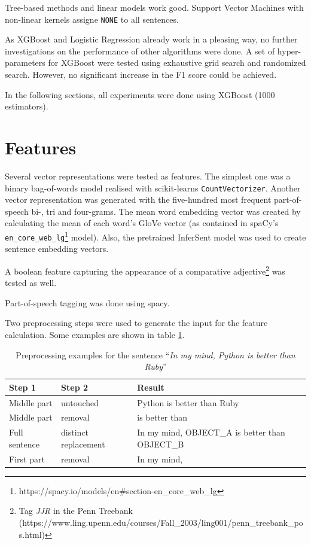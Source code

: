 Tree-based methods and linear models work good. Support Vector Machines with non-linear kernels assigne \texttt{NONE} to all sentences.

As XGBoost and Logistic Regression already work in a pleasing way, no further investigations on the performance of other algorithms were done. A set of hyper-parameters for XGBoost were tested using exhaustive grid search and randomized search. However, no significant increase in the F1 score could be achieved.

In the following sections, all experiments were done using XGBoost (1000 estimators).


\section{Features}
Several vector representations were tested as features. The simplest one was a binary bag-of-words model realised with scikit-learns \texttt{CountVectorizer}. Another vector representation was generated with the five-hundred most frequent part-of-speech bi-, tri and four-grams. The mean word embedding vector was created by calculating the mean of each word's GloVe vector (as contained in spaCy's \texttt{en\_core\_web\_lg}\footnote{https://spacy.io/models/en\#section-en\_core\_web\_lg} model). Also, the pretrained InferSent model was used to create sentence embedding vectors.

A boolean feature capturing the appearance of a comparative adjective\footnote{Tag \emph{JJR} in the Penn Treebank (https://www.ling.upenn.edu/courses/Fall\_2003/ling001/penn\_treebank\_pos.html)} was tested as well. 

Part-of-speech tagging was done using spacy.\newline

Two preprocessing steps were used to generate the input for the feature calculation. Some examples are shown in table \ref{preprocessing_example}.

\begin{table}[ht]
\centering

\caption{Preprocessing examples for the sentence \enquote{\emph{In my mind, Python is better than Ruby}}}
\label{preprocessing_example}
\begin{tabularx}{\linewidth}{llX}
\toprule
Step 1 & Step 2 & Result \\ \midrule
Middle part & untouched & Python is better than Ruby \\
Middle part & removal & is better than \\
Full sentence & distinct replacement &In my mind, OBJECT\_A is better than OBJECT\_B \\
First part & removal & In my mind, \\
\bottomrule
\end{tabularx}

\end{table}

